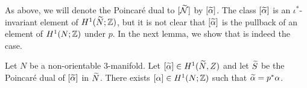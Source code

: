 As above, we will denote the Poincar\'e dual to $[\widetilde{\mathcal{N}}]$ by $[\widetilde{\alpha}]$.  The class $[\widetilde{\alpha}]$ is an $\iota^{\ast}$-invariant element of $H^1(\widetilde{N}; \mathbb{Z})$, but it is not clear that $[\widetilde{\alpha}]$ is the pullback of an element of $H^1(N; \mathbb{Z})$ under $p$.
In the next lemma, we show that is indeed the case.%
\begin{lem}
  \label{lem:PD2}
Let $N$ be a non-orientable 3-manifold.  Let $[\widetilde{\alpha}]\in H^1(\widetilde{N}, Z)$ and let $\widetilde{S}$ be the Poincar\'e dual of $[\widetilde{\alpha}]$ in $\widetilde{N}$.  There exists $[\alpha] \in H^1(N; \mathbb{Z})$ such that $\widetilde{\alpha} = p^{\ast} \alpha$.
\end{lem}
